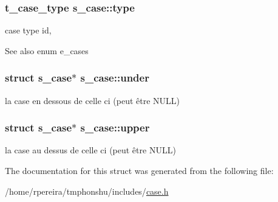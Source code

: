 \subsubsection[{\texorpdfstring{type}{type}}]{\setlength{\rightskip}{0pt plus 5cm}t\+\_\+case\+\_\+type s\+\_\+case\+::type}\hypertarget{structs__case_a4c656b1851b67d43646011c5790f7f69}{}\label{structs__case_a4c656b1851b67d43646011c5790f7f69}
case type id, \begin{DoxySeeAlso}{See also}
enum e\+\_\+cases 
\end{DoxySeeAlso}
\subsubsection[{\texorpdfstring{under}{under}}]{\setlength{\rightskip}{0pt plus 5cm}struct {\bf s\+\_\+case}$\ast$ s\+\_\+case\+::under}\hypertarget{structs__case_a78554a4a011ef2fca3d8542312f64870}{}\label{structs__case_a78554a4a011ef2fca3d8542312f64870}
la case en dessous de celle ci (peut être N\+U\+LL) 
\subsubsection[{\texorpdfstring{upper}{upper}}]{\setlength{\rightskip}{0pt plus 5cm}struct {\bf s\+\_\+case}$\ast$ s\+\_\+case\+::upper}\hypertarget{structs__case_a5e98a39abc778b8e24c6f3ac0c447535}{}\label{structs__case_a5e98a39abc778b8e24c6f3ac0c447535}
la case au dessus de celle ci (peut être N\+U\+LL) 

The documentation for this struct was generated from the following file\+:\begin{DoxyCompactItemize}
\item 
/home/rpereira/tmphonshu/includes/\hyperlink{case_8h}{case.\+h}\end{DoxyCompactItemize}
